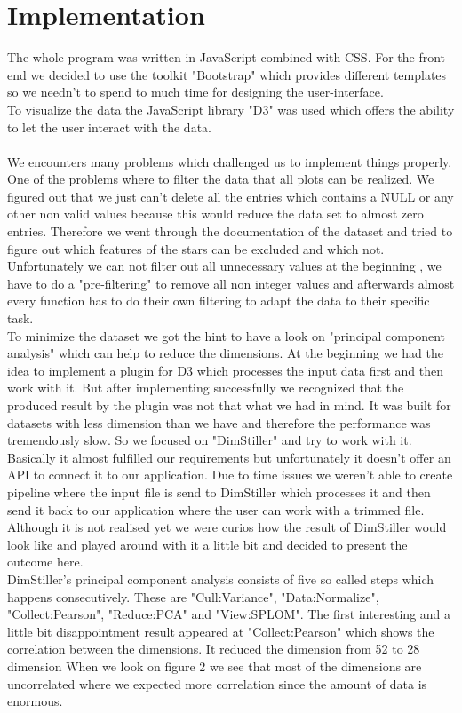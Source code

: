 \documentclass{vgtc}                          %
\begin{document}
\section{Implementation}
The whole program was written in JavaScript combined with CSS. For the front-end we decided to use the toolkit "Bootstrap"\cite{bootstrap} which provides different templates so we needn't to spend to much time for designing the user-interface.\\
To visualize the data the JavaScript library "D3"\cite{d3} was used which offers the ability to let the user interact with the data.\\
\\
We encounters many problems which challenged us to implement things properly. One of the problems where to filter the data that all plots can be realized. We figured out that we just can't delete all the entries which contains a NULL or any other non valid values because this would reduce the data set to almost zero entries. Therefore we went through the documentation of the dataset and tried to figure out which features of the stars can be excluded and which not. Unfortunately we can not filter out all unnecessary values at the beginning , we have to do a "pre-filtering" to remove all non integer values and afterwards almost every function has to do their own filtering to adapt the data to their specific task.\\
To minimize the dataset we got the hint to have a look on "principal component analysis" which can help to reduce the dimensions. At the beginning we had the idea to implement a plugin\cite{pca} for D3 which processes the input data first and then work with it. But after implementing successfully we recognized that the produced result by the plugin was not that what we had in mind. It was built for datasets with less dimension than we have and therefore the performance was tremendously slow. So we focused on "DimStiller"\cite{dimstiller} and try to work with it. Basically it almost fulfilled our requirements but unfortunately it doesn't offer an API to connect it to our application. Due to time issues we weren't able to create pipeline where the input file is send to DimStiller which processes it and then send it back to our application where the user can work with a trimmed file. Although it is not realised yet we were curios how the result of DimStiller would look like and played around with it a little bit and decided to present the outcome here.\\
DimStiller's principal component analysis consists of five so called steps which happens consecutively. These are "Cull:Variance", "Data:Normalize", "Collect:Pearson", "Reduce:PCA" and "View:SPLOM". The first interesting and a little bit disappointment result appeared at "Collect:Pearson" which shows the correlation between the dimensions. It reduced the dimension from 52 to 28 dimension When we look on figure 2 we see that most of the dimensions are uncorrelated where we expected more correlation since the amount of data is enormous.\\
\end{document}
